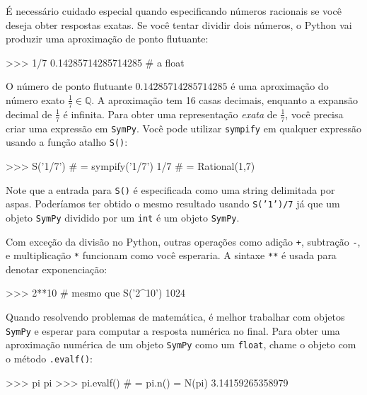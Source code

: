  
	É necessário cuidado especial quando especificando números racionais se você deseja obter respostas exatas. Se você tentar dividir dois números, o Python vai produzir uma aproximação de ponto flutuante:
 \small
\begin{verbatimtab}
>>> 1/7
0.14285714285714285           # a float
\end{verbatimtab}
\normalsize

	\noindent
	O número de ponto flutuante $0.14285714285714285$ é uma aproximação do número exato $\frac{1}{7} \in \mathbb{Q}$. 	
	A aproximação tem 16 casas decimais, enquanto a expansão decimal de $\frac{1}{7}$ é infinita.
	Para obter uma representação \emph{exata} de $\frac{1}{7}$,
	você precisa criar uma expressão em \texttt{SymPy}.
	Você pode utilizar \texttt{sympify} em qualquer expressão usando a função atalho \texttt{S()}:

\small
\begin{verbatimtab}
>>> S('1/7')                  # = sympify('1/7')
1/7                           # = Rational(1,7)
\end{verbatimtab}
\normalsize

\noindent
Note que a entrada para \texttt{S()} é especificada como uma string delimitada por aspas.
Poderíamos ter obtido o mesmo resultado usando \texttt{S('1')/7} já que um objeto \texttt{SymPy} dividido por um \texttt{int} é um objeto \texttt{SymPy}. 

	Com exceção da divisão no Python, outras operações como adição \texttt{+}, subtração \texttt{-}, e multiplicação \texttt{*} funcionam como você esperaria.
	A sintaxe \texttt{**} é usada para denotar exponenciação:				
\small
\begin{verbatimtab}
>>> 2**10                    # mesmo que S('2^10')
1024
\end{verbatimtab}
\normalsize

\noindent
Quando resolvendo problemas de matemática, 
é melhor trabalhar com objetos \texttt{SymPy} e esperar para computar a resposta numérica no final.
Para obter uma aproximação numérica de um objeto \texttt{SymPy} como um \texttt{float}, 
chame o objeto com o método \texttt{.evalf()}: %

\small
\begin{verbatimtab}
>>> pi
pi
>>> pi.evalf()               # = pi.n() = N(pi)
3.14159265358979
\end{verbatimtab}
\normalsize

